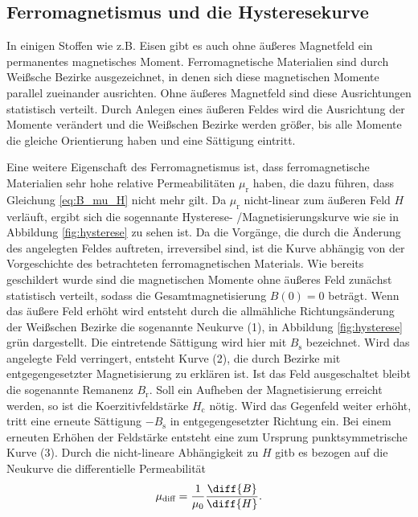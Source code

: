 \subsection{Ferromagnetismus und die Hysteresekurve}
In einigen Stoffen wie z.B. Eisen gibt es auch ohne äußeres Magnetfeld ein permanentes magnetisches Moment.
Ferromagnetische Materialien sind durch Weißsche Bezirke ausgezeichnet, 
in denen sich diese magnetischen Momente parallel zueinander ausrichten.
Ohne äußeres Magnetfeld sind diese Ausrichtungen statistisch verteilt.
Durch Anlegen eines äußeren Feldes wird die Ausrichtung der Momente verändert und die Weißschen Bezirke werden größer,
bis alle Momente die gleiche Orientierung haben und eine Sättigung eintritt.

\noindent
Eine weitere Eigenschaft des Ferromagnetismus ist, dass ferromagnetische Materialien sehr hohe relative Permeabilitäten $\mu_\text{r}$ haben,
die dazu führen, dass Gleichung \eqref{eq:B_mu_H} nicht mehr gilt.
Da $\mu_\text{r}$ nicht-linear zum äußeren Feld $H$ verläuft, ergibt sich die sogennante Hysterese- /Magnetisierungskurve
wie sie in Abbildung \ref{fig:hysterese} zu sehen ist.
Da die Vorgänge, die durch die Änderung des angelegten Feldes auftreten, irreversibel sind, 
ist die Kurve abhängig von der Vorgeschichte des betrachteten ferromagnetischen Materials.
Wie bereits geschildert wurde sind die magnetischen Momente ohne äußeres Feld zunächst statistisch verteilt, 
sodass die Gesamtmagnetisierung $B(0) = 0$ beträgt.
Wenn das äußere Feld erhöht wird entsteht durch die allmähliche Richtungsänderung der Weißschen Bezirke die sogenannte Neukurve (1),
in Abbildung \ref{fig:hysterese} grün dargestellt.
Die eintretende Sättigung wird hier mit $B_\text{s}$ bezeichnet.
Wird das angelegte Feld verringert, entsteht Kurve (2), die durch Bezirke mit entgegengesetzter Magnetisierung zu erklären ist.
Ist das Feld ausgeschaltet bleibt die sogenannte Remanenz $B_\text{r}$.
Soll ein Aufheben der Magnetisierung erreicht werden, so ist die Koerzitivfeldstärke $H_\text{c}$ nötig.
Wird das Gegenfeld weiter erhöht, tritt eine erneute Sättigung $-B_\text{s}$ in entgegengesetzter Richtung ein.
Bei einem erneuten Erhöhen der Feldstärke entsteht eine zum Ursprung punktsymmetrische Kurve (3).
Durch die nicht-lineare Abhängigkeit zu $H$ gitb es bezogen auf die Neukurve die differentielle Permeabilität
\begin{align}
    \mu_\text{diff} = \frac{1}{\mu_0} \frac{\diff{B}}{\diff{H}}.
\end{align}

